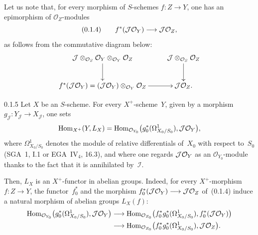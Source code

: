 Let us note that, for every morphism of \(S\)-schemes
\(f\colon Z\to Y\), one has an epimorphism of \(\mathcal{O}_Z\)-modules
\[
(0.1.4)\qquad
f^{*}(\mathcal{J}\mathcal{O}_Y)\longrightarrow\mathcal{J}\mathcal{O}_Z,
\]
as follows from the commutative diagram below:
\[
\xymatrix{
\mathcal{J}\otimes_{\OS}\OY\otimes_{\OY}\mathcal{O}_Z \ar[d]
  & \mathcal{J}\otimes_{\OS}\mathcal{O}_Z \ar[d] \\
f^{*}(\mathcal{J}\OY)=(\mathcal{J}\OY)\otimes_{\OY}\mathcal{O}_Z \ar[r]
  & \mathcal{J}\mathcal{O}_Z.
}
\]

\begin{definition}{0.1.5}
\label{III.0.1.5}
{\renewcommand{\thefootnote}{(8)}}%
Let \(X\) be an \(S\)-scheme. For every \(X^{+}\)-scheme~\(Y\), given by a
morphism \(g_{\mathcal{J}}\colon Y_{\mathcal{J}}\to X_{\mathcal{J}}\),
one sets
\[
\operatorname{Hom}_{X^{+}}(Y,L_X)
=\operatorname{Hom}_{\mathcal{O}_{Y_0}}\bigl(g_0^{*}(\Omega^1_{X_0/S_0}),\mathcal{J}\mathcal{O}_Y\bigr),
\]
where \(\Omega^1_{X_0/S_0}\) denotes the module of relative differentials
of~\(X_0\) with respect to~\(S_0\) (\cf SGA~1, I.1 or
EGA~\(\mathrm{IV}_{4}\), 16.3), and where one regards \(\mathcal{J}\mathcal{O}_Y\)
as an \(\mathcal{O}_{Y_0}\)-module thanks to the fact that it is
annihilated by~\(\mathcal{I}\).
\end{definition}

Then, \(L_X\) is an \(X^{+}\)-functor in abelian groups.%
{\renewcommand{\thefootnote}{(9)}}
Indeed, for every \(X^{+}\)-morphism \(f\colon Z\to Y\), the
functor~\(f_0^{*}\) and the morphism
\(f_0^{*}(\mathcal{J}\mathcal{O}_Y)\longrightarrow\mathcal{J}\mathcal{O}_Z\) of~(0.1.4) induce a
natural morphism of abelian groups \(L_X(f)\):
\begin{align*}
\operatorname{Hom}_{\mathcal{O}_{Y_0}}\bigl(g_0^{*}(\Omega^1_{X_0/S_0}),\mathcal{J}\mathcal{O}_Y\bigr)
&\longrightarrow
\operatorname{Hom}_{\mathcal{O}_{Z_0}}\bigl(f_0^{*}g_0^{*}(\Omega^1_{X_0/S_0}),
f_0^{*}(\mathcal{J}\mathcal{O}_Y)\bigr)\\
&\longrightarrow
\operatorname{Hom}_{\mathcal{O}_{Z_0}}\bigl(f_0^{*}g_0^{*}(\Omega^1_{X_0/S_0}),
\mathcal{J}\mathcal{O}_Z\bigr).
\end{align*}

